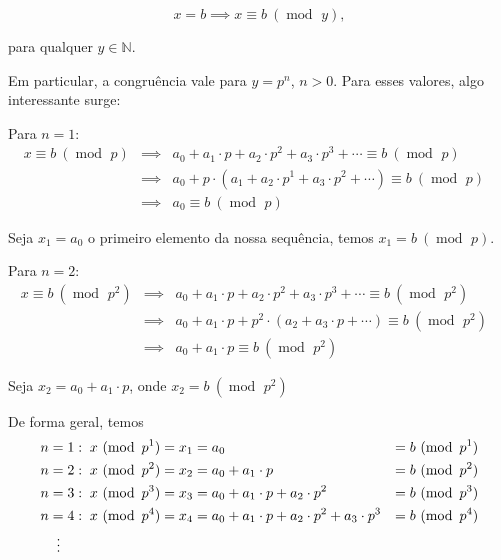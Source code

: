 \documentclass{report}
\DeclareMathOperator{\modulo}{mod \ }
\theoremstyle{definition}
\begin{document}
\begin{equation}
    x = b \implies x \equiv b \ (\modulo y),
\end{equation}

para qualquer $y \in \mathbb{N} $.

Em particular, a congruência vale para $y = p^n$, $n > 0$. Para esses valores, algo interessante surge:

\smallskip

Para $n=1$:
\begin{align*}
    x \equiv b \ (\modulo p) & \implies & a_0 + a_1 \cdot p + a_2 \cdot p^2 + a_3 \cdot p^3 + \cdots \equiv b \ (\modulo p) &  \\
    & \implies & a_0 + p \cdot (a_1 + a_2 \cdot p^1 + a_3 \cdot p^2 + \cdots) \equiv b \ (\modulo p) & \\
    & \implies & a_0 \equiv b \ (\modulo p) &
\end{align*}

Seja $x_1 = a_0$ o primeiro elemento da nossa sequência, temos $x_1 = b \ (\modulo p)$.

\smallskip

Para $n=2$:
\begin{align*}
    x \equiv b \ (\modulo p^2) & \implies & a_0 + a_1 \cdot p + a_2 \cdot p^2 + a_3 \cdot p^3 + \cdots \equiv b \ (\modulo p^2) &\\
    & \implies & a_0 + a_1 \cdot p + p^2 \cdot (a_2 + a_3 \cdot p + \cdots) \equiv b \ (\modulo p^2) &\\
    & \implies & a_0 + a_1 \cdot p \equiv b \ (\modulo p^2) &
\end{align*}

Seja $x_2 = a_0 + a_1 \cdot p$, onde $x_2 = b \ (\modulo p^2)$

\smallskip

De forma geral, temos
\vspace{-4pt}
\begin{align}
    n &= 1: \; x \ (\modulo p^1) = x_1 = a_0                                                  &= b \ (\modulo p^1) \notag\\ 
    n &= 2: \; x \ (\modulo p^2) = x_2 = a_0 + a_1 \cdot p                                    &= b \ (\modulo p^2) \notag\\ 
    n &= 3: \; x \ (\modulo p^3) = x_3 = a_0 + a_1 \cdot p + a_2 \cdot p^2                    &= b \ (\modulo p^3) \notag\\ 
    n &= 4: \; x \ (\modulo p^4) = x_4 = a_0 + a_1 \cdot p + a_2 \cdot p^2 + a_3 \cdot p^3    &= b \ (\modulo p^4) \notag\\ 
    &\;\; \vdots & \label{sistcongru}
\end{align}
\end{document}
